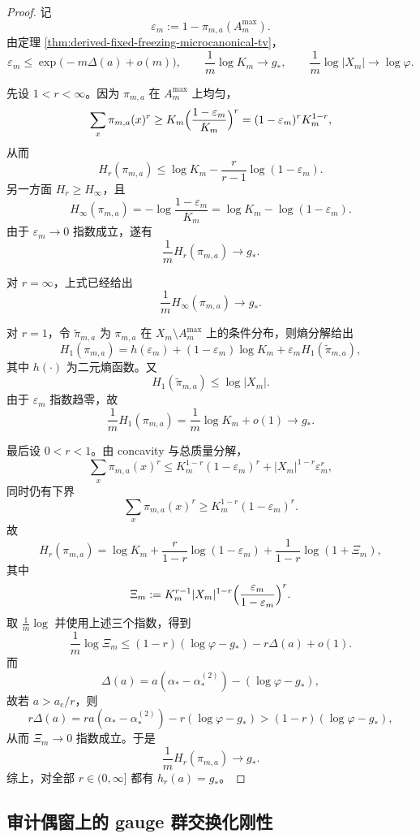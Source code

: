 \begin{proof}
记
\[
\varepsilon_m:=1-\pi_{m,a}(A_m^{\max}).
\]
由定理 \ref{thm:derived-fixed-freezing-microcanonical-tv}，
\[
\varepsilon_m\le \exp\!\bigl(-m\Delta(a)+o(m)\bigr),
\qquad
\frac1m\log K_m\to g_{\ast},
\qquad
\frac1m\log|X_m|\to \log\varphi.
\]

先设 \(1<r<\infty\)。因为 \(\pi_{m,a}\) 在 \(A_m^{\max}\) 上均匀，
\[
\sum_x \pi_{m,a}(x)^r
\ge
K_m\Bigl(\frac{1-\varepsilon_m}{K_m}\Bigr)^r
=(1-\varepsilon_m)^r K_m^{1-r},
\]
从而
\[
H_r(\pi_{m,a})
\le
\log K_m-\frac{r}{r-1}\log(1-\varepsilon_m).
\]
另一方面 \(H_r\ge H_{\infty}\)，且
\[
H_{\infty}(\pi_{m,a})
=
-\log\frac{1-\varepsilon_m}{K_m}
=
\log K_m-\log(1-\varepsilon_m).
\]
由于 \(\varepsilon_m\to 0\) 指数成立，遂有
\[
\frac1m H_r(\pi_{m,a})\to g_{\ast}.
\]

对 \(r=\infty\)，上式已经给出
\[
\frac1m H_{\infty}(\pi_{m,a})\to g_{\ast}.
\]

对 \(r=1\)，令 \(\widetilde\pi_{m,a}\) 为 \(\pi_{m,a}\) 在 \(X_m\setminus A_m^{\max}\) 上的条件分布，则熵分解给出
\[
H_1(\pi_{m,a})
=
h(\varepsilon_m)+(1-\varepsilon_m)\log K_m+\varepsilon_m H_1(\widetilde\pi_{m,a}),
\]
其中 \(h(\cdot)\) 为二元熵函数。又
\[
H_1(\widetilde\pi_{m,a})\le \log|X_m|.
\]
由于 \(\varepsilon_m\) 指数趋零，故
\[
\frac1m H_1(\pi_{m,a})
=
\frac1m\log K_m+o(1)\to g_{\ast}.
\]

最后设 \(0<r<1\)。由 concavity 与总质量分解，
\[
\sum_x \pi_{m,a}(x)^r
\le
K_m^{1-r}(1-\varepsilon_m)^r
+
|X_m|^{1-r}\varepsilon_m^r,
\]
同时仍有下界
\[
\sum_x \pi_{m,a}(x)^r
\ge
K_m^{1-r}(1-\varepsilon_m)^r.
\]
故
\[
H_r(\pi_{m,a})
=
\log K_m
+
\frac{r}{1-r}\log(1-\varepsilon_m)
+
\frac{1}{1-r}\log(1+\Xi_m),
\]
其中
\[
\Xi_m:=
K_m^{r-1}|X_m|^{1-r}
\Bigl(\frac{\varepsilon_m}{1-\varepsilon_m}\Bigr)^r.
\]
取 \(\frac1m\log\) 并使用上述三个指数，得到
\[
\frac1m\log \Xi_m
\le
(1-r)(\log\varphi-g_{\ast})-r\Delta(a)+o(1).
\]
而
\[
\Delta(a)=a(\alpha_{\ast}-\alpha_{\ast}^{(2)})-(\log\varphi-g_{\ast}),
\]
故若 \(a>a_{\mathrm c}/r\)，则
\[
r\Delta(a)
=
ra(\alpha_{\ast}-\alpha_{\ast}^{(2)})-r(\log\varphi-g_{\ast})
>
(1-r)(\log\varphi-g_{\ast}),
\]
从而 \(\Xi_m\to 0\) 指数成立。于是
\[
\frac1m H_r(\pi_{m,a})\to g_{\ast}.
\]
综上，对全部 \(r\in(0,\infty]\) 都有 \(h_r(a)=g_{\ast}\)。
\end{proof}

\subsection{审计偶窗上的 gauge 群交换化刚性}

